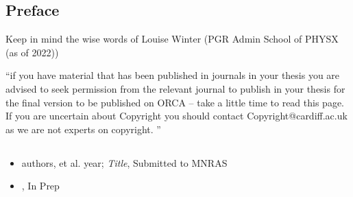 \subsection*{Preface}
Keep in mind the wise words of Louise Winter (PGR Admin School of PHYSX (as of 2022))

``if you have material that has been published in journals in your thesis you are advised to seek permission from the relevant journal to publish in your thesis for the final version to be published on ORCA – take a little time to read this page.  If you are uncertain about Copyright you should contact Copyright@cardiff.ac.uk as we are not experts on copyright. ''


\subsection*{}

\begin{itemize}
  \item[] \large {authors,  et al.  year; \textit{Title}, Submitted to MNRAS}
\end{itemize} 


\begin{itemize}

  \item[] \large { \textit{}, In Prep}  
 
\end{itemize}  